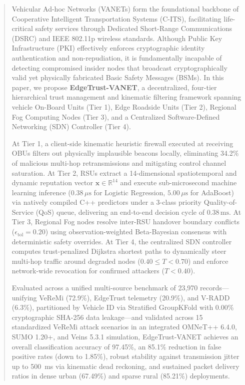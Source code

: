 \documentclass[conference]{IEEEtran}
\begin{document}
\begin{abstract}
Vehicular Ad-hoc Networks (VANETs) form the foundational backbone of Cooperative Intelligent Transportation Systems (C-ITS), facilitating life-critical safety services through Dedicated Short-Range Communications (DSRC) and IEEE 802.11p wireless standards. Although Public Key Infrastructure (PKI) effectively enforces cryptographic identity authentication and non-repudiation, it is fundamentally incapable of detecting compromised insider nodes that broadcast cryptographically valid yet physically fabricated Basic Safety Messages (BSMs). In this paper, we propose \textbf{EdgeTrust-VANET}, a decentralized, four-tier hierarchical trust management and kinematic filtering framework spanning vehicle On-Board Units (Tier 1), Edge Roadside Units (Tier 2), Regional Fog Computing Nodes (Tier 3), and a Centralized Software-Defined Networking (SDN) Controller (Tier 4). 

At Tier 1, a client-side kinematic heuristic firewall executed at receiving OBUs filters out physically implausible beacons locally, eliminating 34.2\% of malicious multi-hop retransmissions and mitigating control channel saturation. At Tier 2, RSUs extract a 14-dimensional spatiotemporal and dynamic reputation vector $\mathbf{x} \in \mathbb{R}^{14}$ and execute sub-microsecond machine learning inference ($0.38\,\mu\text{s}$ for Logistic Regression, $5.00\,\mu\text{s}$ for AdaBoost) via natively compiled C++ predictors under a 3-class priority Quality-of-Service (QoS) queue, delivering an end-to-end decision cycle of $0.38\,\text{ms}$. At Tier 3, Regional Fog nodes resolve inter-RSU handover boundary conflicts ($\epsilon_{\text{tol}} = 0.20$) using observation-weighted Beta-Bayesian consensus with deterministic safety overrides. At Tier 4, the centralized SDN controller computes trust-penalized Dijkstra shortest paths to dynamically steer multi-hop traffic around degraded nodes ($0.40 \le T < 0.70$) and enforce network-wide revocation for confirmed attackers ($T < 0.40$). 

Evaluated across a unified multi-source benchmark of 23,970 records---unifying VeReMi (72.9\%), EdgeTrust telemetry (20.9\%), and V-RADD (6.3\%), partitioned by Vehicle ID via Stratified GroupKFold with 0.00\% cryptographic SHA-256 data leakage---and validated across 15 standardized VeReMi attack scenarios in an integrated OMNeT++ 6.4.0, SUMO 1.20+, and Veins 5.3.1 simulation, EdgeTrust-VANET achieves an overall classification accuracy of 97.45\%, an 85.1\% reduction in false positive rates (down to 1.85\%), robust stability against transmission jitter up to 500~ms via kinematic dead reckoning, and sustained packet delivery ratios in dense urban (67.49\%) and sparse rural (85.21\%) deployments.
\end{abstract}
\end{document}
